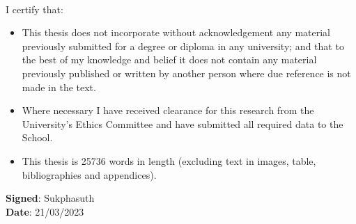 
 \\
I certify that: \\ 
\begin{itemize}
  \item This thesis does not incorporate without acknowledgement any material previously
submitted for a degree or diploma in any university; and that to the best of my
knowledge and belief it does not contain any material previously published or
written by another person where due reference is not made in the text.
  \item Where necessary I have received clearance for this research from the University’s
Ethics Committee and have submitted all required data to the School.
\item This thesis is 25736 words in length (excluding text in images, table, bibliographies
and appendices).
\end{itemize}

\vspace{2cm}
\noindent \textbf{Signed}: Sukphasuth  \\
\vspace{0.5cm}
\textbf{Date}: 21/03/2023 \\
\newpage